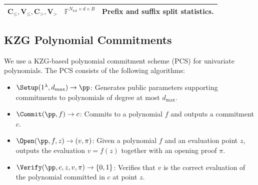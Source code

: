 \begin{table}[t]
\begin{tabular}{@{}p{}p{}p{}@{}}
        $\mathbf{C}_{\leq},\mathbf{V}_{\leq},\mathbf{C}_{>},\mathbf{V}_{>}$ & $\mathbb{F}^{N_{\mathrm{tot}}\times d\times B}$ & Prefix and suffix split statistics. \\
        \bottomrule
    \end{tabular}
\end{table}

\subsection{KZG Polynomial Commitments}

We use a KZG-based polynomial commitment scheme (PCS) for univariate polynomials.
The PCS consists of the following algorithms:

\begin{itemize}
    \item $\Setup(1^\lambda, d_{\max}) \rightarrow \pp$:
    Generates public parameters supporting commitments to polynomials of degree at most $d_{\max}$.

    \item $\Commit(\pp, f) \rightarrow c$:
    Commits to a polynomial $f$ and outputs a commitment $c$.

    \item $\Open(\pp, f, z) \rightarrow (v, \pi)$:
    Given a polynomial $f$ and an evaluation point $z$, outputs the evaluation
    $v = f(z)$ together with an opening proof $\pi$.

    \item $\Verify(\pp, c, z, v, \pi) \rightarrow \{0,1\}$:
    Verifies that $v$ is the correct evaluation of the polynomial committed in $c$
    at point $z$.
\end{itemize}

